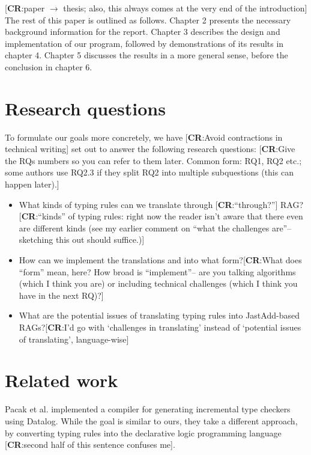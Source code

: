\documentclass[nofilelist]{cslthse-msc}
\newcommand{\CR}[1]{\textcolor{green!60!black}{[\textbf{CR}:#1]}}
\begin{document}
\CR{paper $\to$ thesis; also, this always comes at the very end of the introduction}
The rest of this paper is outlined as follows.
Chapter 2 presents the necessary background information for the report.
Chapter 3 describes the design and implementation of our program, followed by demonstrations of its results in chapter 4.
Chapter 5 discusses the results in a more general sense, before the conclusion in chapter 6.

\section{Research questions}
To formulate our goals more concretely, we have \CR{Avoid contractions in technical writing} set out to answer the following research questions:
\CR{Give the RQs numbers so you can refer to them later.  Common form: RQ1, RQ2 etc.; some authors use RQ2.3 if they split RQ2 into multiple subquestions (this can happen later).}
\newcommand{\rqone}{What kinds of typing rules can we translate through \CR{``through?''} RAG?}
\newcommand{\rqtwo}{How can we implement the translations and into what form?}
\newcommand{\rqthree}{What are the potential issues of translating typing rules into JastAdd-based RAGs?}
\begin{itemize}
  \item \rqone \CR{``kinds'' of typing rules: right now the reader isn't aware that there even are different kinds (see my earlier comment on ``what the challenges are''-- sketching this out should suffice.)}
  \item \rqtwo \CR{What does ``form'' mean, here?  How broad is ``implement''-- are you talking algorithms (which I think you are) or including technical challenges (which I think you have in the next RQ)?}
  \item \rqthree \CR{I'd go with `challenges in translating' instead of `potential issues of translating', language-wise}
\end{itemize}


\section{Related work} %
Pacak et al. implemented a compiler for generating incremental type checkers using Datalog\cite{Pacak}.
While the goal is similar to ours, they take a different approach, by converting typing rules into the declarative logic programming language \CR{second half of this sentence confuses me}.
\end{document}
